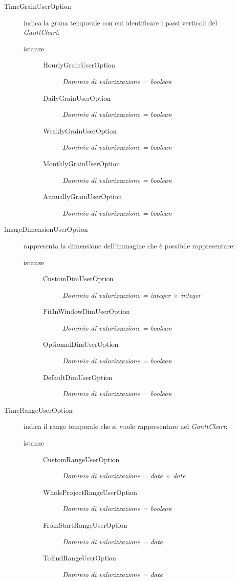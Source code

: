 \begin{description}
\begin{description}
	\item[TimeGrainUserOption] indica la grana temporale con cui identificare i
	passi verticali del \emph{GanttChart}:
	    \begin{description}
		  \item[istanze]\quad
		  \begin{description}
			\item[HourlyGrainUserOption] \emph{Dominio di valorizzazione = boolean}
			\item[DailyGrainUserOption] \emph{Dominio di valorizzazione = boolean}
			\item[WeaklyGrainUserOption] \emph{Dominio di valorizzazione = boolean}
			\item[MonthlyGrainUserOption] \emph{Dominio di valorizzazione = boolean}
			\item[AnnuallyGrainUserOption] \emph{Dominio di valorizzazione = boolean}
		  \end{description}
		\end{description}

	\item[ImageDimensionUserOption] rappresenta la dimensione dell'immagine che
	\`e possibile rappresentare:
	    \begin{description}
	  	\item[istanze]\quad
		  \begin{description}
			\item[CustomDimUserOption] \emph{Dominio di valorizzazione = integer
			$\times$ integer}
			\item[FitInWindowDimUserOption] \emph{Dominio di valorizzazione = boolean}
			\item[OptiomalDimUserOption] \emph{Dominio di valorizzazione = boolean}
			\item[DefaultDimUserOption] \emph{Dominio di valorizzazione = boolean}
		  \end{description}
	\end{description}
	
	\item[TimeRangeUserOption] indica il range temporale che si vuole
	rappresentare nel \emph{GanttChart}:
	    \begin{description}
	  		\item[istanze]\quad
			  \begin{description}
				\item[CustomRangeUserOption] \emph{Dominio di valorizzazione = date
				$\times$ date}
				\item[WholeProjectRangeUserOption] \emph{Dominio di valorizzazione = boolean}
				\item[FromStartRangeUserOption] \emph{Dominio di valorizzazione = date}
				\item[ToEndRangeUserOption] \emph{Dominio di valorizzazione = date}
			  \end{description}
		\end{description}

  \end{description}
\end{description}

